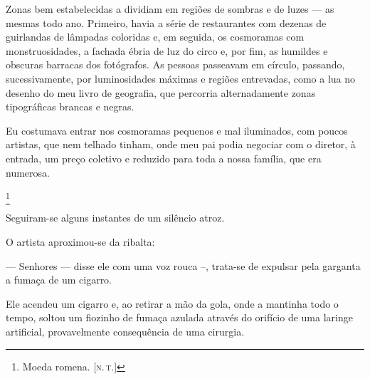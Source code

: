 Zonas bem estabelecidas a dividiam em regiões de sombras e de luzes --- as
mesmas todo ano. Primeiro, havia a série de restaurantes com dezenas de
guirlandas de lâmpadas coloridas e, em seguida, os cosmoramas com
monstruosidades, a fachada ébria de luz do circo e, por fim, as humildes e
obscuras barracas dos fotógrafos. As pessoas passeavam em círculo, passando,
sucessivamente, por luminosidades máximas e regiões entrevadas, como a lua no
desenho do meu livro de geografia, que percorria alternadamente zonas
tipográficas brancas e negras.

Eu costumava entrar nos cosmoramas pequenos e mal iluminados, com poucos
artistas, que nem telhado tinham, onde meu pai podia negociar com o diretor,
à entrada, um preço coletivo e reduzido para toda a nossa família, que era
numerosa.


\footnote{Moeda romena. {[}\textsc{n.\,t.}{]}} 

Seguiram-se alguns instantes de um silêncio atroz.

O artista aproximou-se da ribalta: 

--- Senhores --- disse ele com uma voz rouca --, trata-se de expulsar pela
    garganta a fumaça de um cigarro. 

Ele acendeu um cigarro e, ao retirar a mão da gola, onde a mantinha todo o
tempo, soltou um fiozinho de fumaça azulada através do orifício de uma
laringe artificial, provavelmente consequência de uma cirurgia. 

